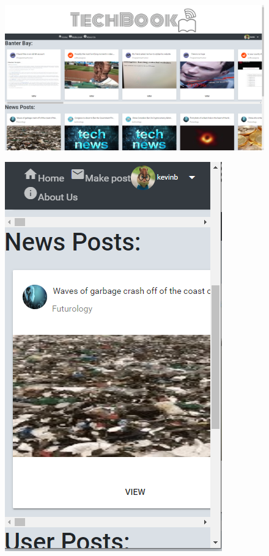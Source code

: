 \begin{figure}[H]
\centering
\begin{minipage}{.75\textwidth}
  \centering
  \includegraphics[width=.9\linewidth]{img/ui/homepcsnap.PNG}
  \label{fig:test1}
\end{minipage}%
\begin{minipage}{.25\textwidth}
  \centering
  \includegraphics[width=.9\linewidth]{img/ui/homemobile.PNG}
  \label{fig:test2}
\end{minipage}
\end{figure}

